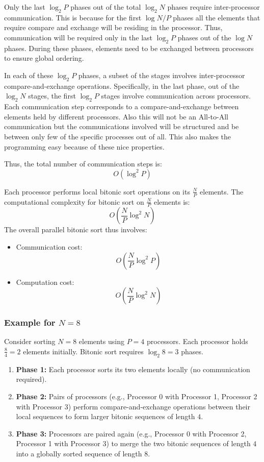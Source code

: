 \documentclass[12pt]{book}
\begin{document}
Only the last $\log_2 P$ phases out of the total $\log_2 N$ phases require inter-processor communication. This is because for the first $\log N/P$ phases all the elements that require compare and exchange will be residing in the processor. Thus, communication will be required only in the last $\log_2 P$ phases out of the $\log N$ phases. During these phases, elements need to be exchanged between processors to ensure global ordering. 

In each of these $\log_2 P$ phases, a subset of the stages involves inter-processor compare-and-exchange operations. Specifically, in the last phase, out of the $\log_2 N$ stages, the first $\log_2 P$ stages involve communication across processors. Each communication step corresponds to a compare-and-exchange between elements held by different processors. Also this will not be an All-to-All communication but the communications involved will be structured and be between only few of the specific processes out of all. This also makes the programming easy because of these nice properties.

Thus, the total number of communication steps is:
\[
O(\log^2 P)
\]

Each processor performs local bitonic sort operations on its $\frac{N}{P}$ elements. The computational complexity for bitonic sort on $\frac{N}{P}$ elements is:
\[
O\left(\frac{N}{P} \log^2 N\right)
\]
The overall parallel bitonic sort thus involves:
\begin{itemize}
    \item Communication cost: 
    \[
    O\left(\frac{N}{P} \log^2 P\right)
    \]
    \item Computation cost:
    \[
    O\left(\frac{N}{P} \log^2 N\right)
    \]
\end{itemize}

\subsubsection*{Example for $N=8$}

Consider sorting $N = 8$ elements using $P=4$ processors. Each processor holds $\frac{8}{4}=2$ elements initially. Bitonic sort requires $\log_2 8 = 3$ phases.

\begin{enumerate}
    \item \textbf{Phase 1:} Each processor sorts its two elements locally (no communication required).
    \item \textbf{Phase 2:} Pairs of processors (e.g., Processor 0 with Processor 1, Processor 2 with Processor 3) perform compare-and-exchange operations between their local sequences to form larger bitonic sequences of length $4$.
    \item \textbf{Phase 3:} Processors are paired again (e.g., Processor 0 with Processor 2, Processor 1 with Processor 3) to merge the two bitonic sequences of length $4$ into a globally sorted sequence of length $8$.
\end{enumerate}
\end{document}
